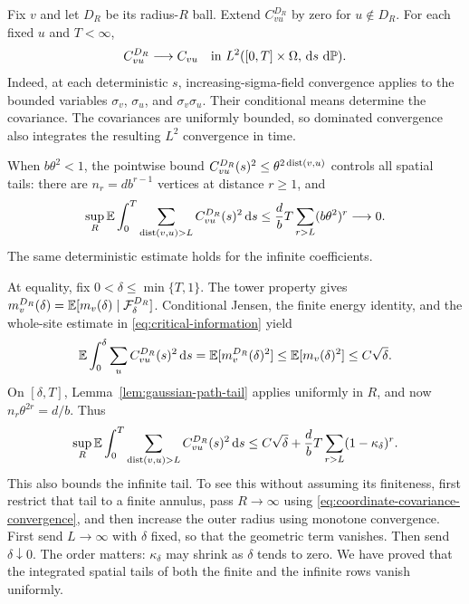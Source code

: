 Fix $v$ and let $D_R$ be its radius-$R$ ball.  Extend
$C_{vu}^{D_R}$ by zero for $u\notin D_R$.  For each fixed $u$ and
$T<\infty$,
\begin{equation}
 \label{eq:coordinate-covariance-convergence}
 C_{vu}^{D_R}\longrightarrow C_{vu}
 \quad\text{in }L^2([0,T]\times\Omega,\,\mathrm d s\,\,\mathrm d\mathbb P).
\end{equation}
Indeed, at each deterministic $s$, increasing-sigma-field convergence
applies to the bounded variables $\sigma_v$, $\sigma_u$, and
$\sigma_v\sigma_u$.  Their conditional means determine the
covariance.  The covariances are uniformly bounded, so dominated
convergence also integrates the resulting $L^2$ convergence in time.

When $b\theta^2<1$, the pointwise bound
$C_{vu}^{D_R}(s)^2\le\theta^{2\operatorname{dist}(v,u)}$ controls all spatial tails:
there are $n_r=db^{r-1}$ vertices at distance $r\ge1$, and
\[
 \sup_R\mathbb E\int_0^T\sum_{\operatorname{dist}(v,u)>L}C_{vu}^{D_R}(s)^2\,\mathrm d s
 \le \frac db T\sum_{r>L}(b\theta^2)^r\longrightarrow0.
\]
The same deterministic estimate holds for the infinite coefficients.

At equality, fix $0<\delta\le\min\{T,1\}$.  The tower property gives
$m_v^{D_R}(\delta)=
\mathbb E[m_v(\delta)\mid\mathcal F_\delta^{D_R}]$.  Conditional Jensen,
the finite energy identity, and the whole-site estimate in
\eqref{eq:critical-information} yield
\begin{equation}
 \label{eq:early-energy}
 \mathbb E\int_0^\delta\sum_u C_{vu}^{D_R}(s)^2\,\mathrm d s
   =\mathbb E[m_v^{D_R}(\delta)^2]
   \le\mathbb E[m_v(\delta)^2]\le C\sqrt\delta .
\end{equation}
On $[\delta,T]$, Lemma~\ref{lem:gaussian-path-tail} applies uniformly
in $R$, and now $n_r\theta^{2r}=d/b$.  Thus
\begin{equation}
 \label{eq:uniform-energy-tail}
 \sup_R\mathbb E\int_0^T
       \sum_{\operatorname{dist}(v,u)>L}C_{vu}^{D_R}(s)^2\,\mathrm d s
 \le C\sqrt\delta+\frac db T
                    \sum_{r>L}(1-\kappa_\delta)^r .
\end{equation}
This also bounds the infinite tail.  To see this without assuming
its finiteness, first restrict that tail to a finite annulus,
pass $R\to\infty$ using
\eqref{eq:coordinate-covariance-convergence}, and then increase the
outer radius using monotone convergence.  First send $L\to\infty$
with $\delta$ fixed, so that the geometric term vanishes.  Then send
$\delta\downarrow0$.  The order matters: $\kappa_\delta$ may shrink
as $\delta$ tends to zero.  We have proved that the integrated spatial
tails of both the finite and the infinite rows vanish uniformly.

